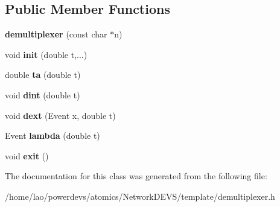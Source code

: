 \subsection*{Public Member Functions}
\begin{DoxyCompactItemize}
\item 
{\bfseries demultiplexer} (const char $\ast$n)\hypertarget{classdemultiplexer_ac0ffa1eb3ce7caac3f20f3908d7d819d}{}\label{classdemultiplexer_ac0ffa1eb3ce7caac3f20f3908d7d819d}

\item 
void {\bfseries init} (double t,...)\hypertarget{classdemultiplexer_ac7c93289875df74e1dfcd2175df19166}{}\label{classdemultiplexer_ac7c93289875df74e1dfcd2175df19166}

\item 
double {\bfseries ta} (double t)\hypertarget{classdemultiplexer_a4c7cc8b523b116010118d564ef8a4d8a}{}\label{classdemultiplexer_a4c7cc8b523b116010118d564ef8a4d8a}

\item 
void {\bfseries dint} (double t)\hypertarget{classdemultiplexer_a4921af7a5202a37af68b1b2197cc3285}{}\label{classdemultiplexer_a4921af7a5202a37af68b1b2197cc3285}

\item 
void {\bfseries dext} (Event x, double t)\hypertarget{classdemultiplexer_aae8739a52134e736f3fab5719518ba74}{}\label{classdemultiplexer_aae8739a52134e736f3fab5719518ba74}

\item 
Event {\bfseries lambda} (double t)\hypertarget{classdemultiplexer_a8fdbd39d23564293c263a42a9513392d}{}\label{classdemultiplexer_a8fdbd39d23564293c263a42a9513392d}

\item 
void {\bfseries exit} ()\hypertarget{classdemultiplexer_a201e20cca9a7d603d3373ca7053e6b7d}{}\label{classdemultiplexer_a201e20cca9a7d603d3373ca7053e6b7d}

\end{DoxyCompactItemize}


The documentation for this class was generated from the following file\+:\begin{DoxyCompactItemize}
\item 
/home/lao/powerdevs/atomics/\+Network\+D\+E\+V\+S/template/demultiplexer.\+h\end{DoxyCompactItemize}
